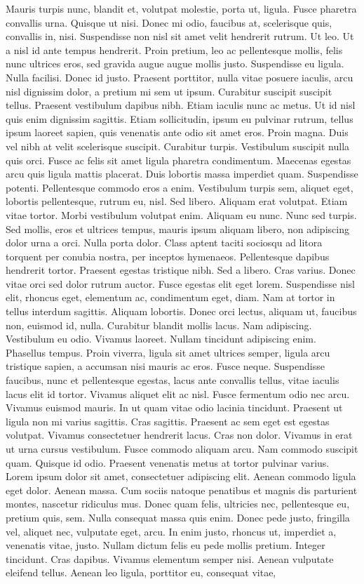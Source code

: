 Mauris turpis nunc, blandit et, volutpat molestie, porta ut, ligula. Fusce pharetra convallis urna. Quisque ut nisi. Donec mi odio, faucibus at, scelerisque quis, convallis in, nisi. Suspendisse non nisl sit amet velit hendrerit rutrum. Ut leo. Ut a nisl id ante tempus hendrerit. Proin pretium, leo ac pellentesque mollis, felis nunc ultrices eros, sed gravida augue augue mollis justo. Suspendisse eu ligula. Nulla facilisi. Donec id justo. Praesent porttitor, nulla vitae posuere iaculis, arcu nisl dignissim dolor, a pretium mi sem ut ipsum. Curabitur suscipit suscipit tellus. Praesent vestibulum dapibus nibh. Etiam iaculis nunc ac metus. Ut id nisl quis enim dignissim sagittis. Etiam sollicitudin, ipsum eu pulvinar rutrum, tellus ipsum laoreet sapien, quis venenatis ante odio sit amet eros. Proin magna. Duis vel nibh at velit scelerisque suscipit. Curabitur turpis. Vestibulum suscipit nulla quis orci. Fusce ac felis sit amet ligula pharetra condimentum. Maecenas egestas arcu quis ligula mattis placerat. Duis lobortis massa imperdiet quam. Suspendisse potenti. Pellentesque commodo eros a enim. Vestibulum turpis sem, aliquet eget, lobortis pellentesque, rutrum eu, nisl. Sed libero. Aliquam erat volutpat. Etiam vitae tortor. Morbi vestibulum volutpat enim. Aliquam eu nunc. Nunc sed turpis. Sed mollis, eros et ultrices tempus, mauris ipsum aliquam libero, non adipiscing dolor urna a orci. Nulla porta dolor. Class aptent taciti sociosqu ad litora torquent per conubia nostra, per inceptos hymenaeos. Pellentesque dapibus hendrerit tortor. Praesent egestas tristique nibh. Sed a libero. Cras varius. Donec vitae orci sed dolor rutrum auctor. Fusce egestas elit eget lorem. Suspendisse nisl elit, rhoncus eget, elementum ac, condimentum eget, diam. Nam at tortor in tellus interdum sagittis. Aliquam lobortis. Donec orci lectus, aliquam ut, faucibus non, euismod id, nulla. Curabitur blandit mollis lacus. Nam adipiscing. Vestibulum eu odio. Vivamus laoreet. Nullam tincidunt adipiscing enim. Phasellus tempus. Proin viverra, ligula sit amet ultrices semper, ligula arcu tristique sapien, a accumsan nisi mauris ac eros. Fusce neque. Suspendisse faucibus, nunc et pellentesque egestas, lacus ante convallis tellus, vitae iaculis lacus elit id tortor. Vivamus aliquet elit ac nisl. Fusce fermentum odio nec arcu. Vivamus euismod mauris. In ut quam vitae odio lacinia tincidunt. Praesent ut ligula non mi varius sagittis. Cras sagittis. Praesent ac sem eget est egestas volutpat. Vivamus consectetuer hendrerit lacus. Cras non dolor. Vivamus in erat ut urna cursus vestibulum. Fusce commodo aliquam arcu. Nam commodo suscipit quam. Quisque id odio. Praesent venenatis metus at tortor pulvinar varius. Lorem ipsum dolor sit amet, consectetuer adipiscing elit. Aenean commodo ligula eget dolor. Aenean massa. Cum sociis natoque penatibus et magnis dis parturient montes, nascetur ridiculus mus. Donec quam felis, ultricies nec, pellentesque eu, pretium quis, sem. Nulla consequat massa quis enim. Donec pede justo, fringilla vel, aliquet nec, vulputate eget, arcu. In enim justo, rhoncus ut, imperdiet a, venenatis vitae, justo. Nullam dictum felis eu pede mollis pretium. Integer tincidunt. Cras dapibus. Vivamus elementum semper nisi. Aenean vulputate eleifend tellus. Aenean leo ligula, porttitor eu, consequat vitae, 